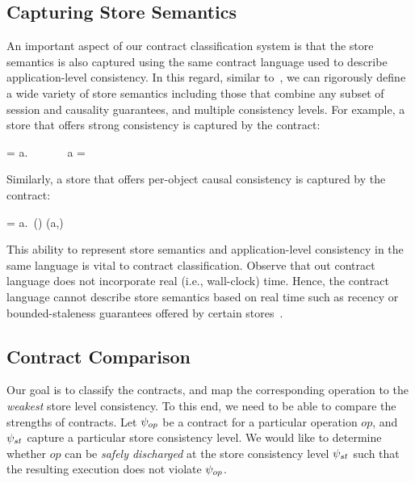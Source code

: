 \subsection{Capturing Store Semantics}
\label{sec:store_sem}

An important aspect of our contract classification system is that the store
semantics is also captured using the same contract language used to describe
application-level consistency. In this regard, similar
to~\cite{Burckhardt2014}, we can rigorously define a wide variety of store
semantics including those that combine any subset of session and causality
guarantees, and multiple consistency levels. For example, a store that offers
strong consistency is captured by the contract:

\vspace{-1em}
\begin{smathpar}
\scc = \forall a.~ \Rightarrow {} ~\vee~  ~\vee~ a = \cureff
\end{smathpar}

Similarly, a store that offers per-object causal consistency is captured by the
contract:

\vspace{-1em}
\begin{smathpar}
\ccc = \forall a.~(\hboZ \cap \sameobjZ) (a,\cureff) \Rightarrow {}
\end{smathpar}

This ability to represent store semantics and application-level consistency in
the same language is vital to contract classification. Observe that out
contract language does not incorporate real (i.e., wall-clock) time. Hence, the
contract language cannot describe store semantics based on real time such as
recency or bounded-staleness guarantees offered by certain
stores~\cite{Pileus}.

\subsection{Contract Comparison}

Our goal is to classify the contracts, and map the corresponding operation to
the \emph{weakest} store level consistency. To this end, we need to be able to
compare the strengths of contracts. Let $\psi_{op}$ be a contract for a
particular operation $op$, and $\psi_{st}$ capture a particular store
consistency level. We would like to determine whether $op$ can be \emph{safely
discharged} at the store consistency level $\psi_{st}$ such that the resulting
execution does not violate $\psi_{op}$.

